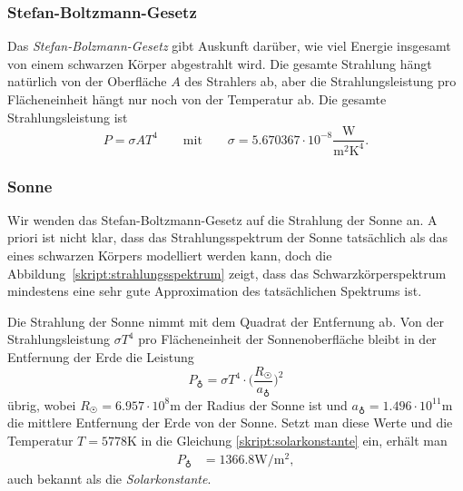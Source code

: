 \subsubsection{Stefan-Boltzmann-Gesetz}
Das {\em Stefan-Bolzmann-Gesetz} gibt Auskunft darüber, wie viel
Energie insgesamt von einem schwarzen Körper abgestrahlt wird.
Die gesamte Strahlung hängt natürlich von der Oberfläche $A$ des Strahlers ab,
aber die Strahlungsleistung pro Flächeneinheit hängt
nur noch von der
Temperatur ab.
Die gesamte Strahlungsleistung ist
\begin{equation}
P=\sigma AT^4
\qquad \text{mit}\qquad
\sigma=5.670367\cdot10^{-8}\frac{\text{W}}{\text{m}^2\text{K}^4}.
\label{skript:stefon-boltzmann}
\end{equation}

\subsubsection{Sonne}
Wir wenden das Stefan-Boltzmann-Gesetz auf die Strahlung der Sonne an.
A priori ist nicht klar, dass das Strahlungsspektrum der Sonne tatsächlich
als das eines schwarzen Körpers modelliert werden kann, doch die
Abbildung~\ref{skript:strahlungsspektrum} zeigt, dass das Schwarzkörperspektrum
mindestens eine sehr gute Approximation des tatsächlichen Spektrums ist.

Die Strahlung der Sonne nimmt mit dem Quadrat der Entfernung ab.
Von der Strahlungsleistung $\sigma T^4$ pro Flächeneinheit der
Sonnenoberfläche bleibt in der Entfernung der Erde die Leistung
\begin{equation}
P_{\earth}
=
\sigma T^4\cdot \biggl(\frac{R_{\astrosun}}{a_{\earth}}\biggr)^2
\label{skript:solarkonstante}
\end{equation}
übrig,
wobei $R_{\astrosun}=6.957\cdot 10^8\text{m}$ der Radius der Sonne ist und
$a_{\earth}=1.496\cdot 10^{11}\text{m}$ die mittlere Entfernung der Erde
von der Sonne.
Setzt man diese Werte und die Temperatur $T=5778\text{K}$ in die Gleichung
\eqref{skript:solarkonstante}
ein, erhält man
\begin{align*}
P_{\earth}
&=
1366.8 \text{W}/\text{m}^2,
\end{align*}
auch bekannt als die {\em Solarkonstante}.

